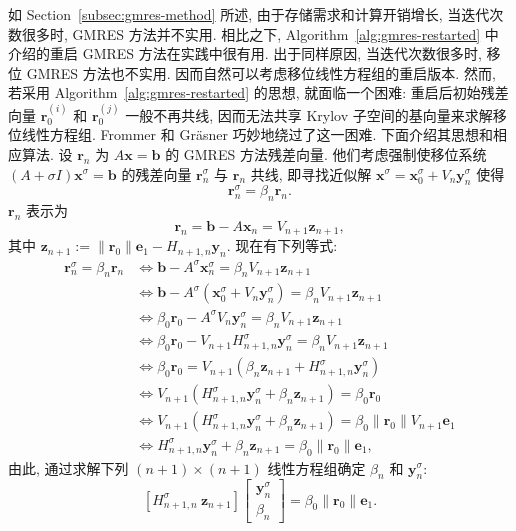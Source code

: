 {如 Section\ \ref{subsec:gmres-method} 所述, 由于存储需求和计算开销增长, 当迭代次数很多时, GMRES 方法并不实用. 相比之下, Algorithm\ \ref{alg:gmres-restarted} 中介绍的重启 GMRES 方法在实践中很有用. 出于同样原因, 当迭代次数很多时, 移位 GMRES 方法也不实用. 因而自然可以考虑移位线性方程组的重启版本. 然而, 若采用 Algorithm\ \ref{alg:gmres-restarted} 的思想, 就面临一个困难: 重启后初始残差向量 $\bm r_0^{(i)}$ 和 $\bm r_0^{(j)}$ 一般不再共线, 因而无法共享 Krylov 子空间的基向量来求解移位线性方程组.}
{Frommer 和 Gräsner  巧妙地绕过了这一困难. 下面介绍其思想和相应算法. 设 $\bm r_n$ 为 $A\bm x=\bm b$ 的 GMRES 方法残差向量. 他们考虑强制使移位系统 $(A+\sigma I)\bm x^{\sigma}=\bm b$ 的残差向量 $\bm r_n^{\sigma}$ 与 $\bm r_n$ 共线, 即寻找近似解 $\bm x^{\sigma}=\bm x_0^{\sigma}+V_n\bm y_n^{\sigma}$ 使得}
\[\bm r_n^{\sigma}=\beta_n\bm r_n.\]
{$\bm r_n$ 表示为}
\[\bm r_n=\bm b-A\bm x_n=V_{n+1}\bm z_{n+1},\]
{其中 $\bm z_{n+1}:=\|\bm r_0\|\bm e_1-H_{n+1,n}\bm y_n$. 现在有下列等式:}
\[\begin{aligned}\bm r_n^{\sigma}=\beta_n\bm r_n&\Leftrightarrow\bm b-A^{\sigma}\bm x_n^{\sigma}=\beta_nV_{n+1}\bm z_{n+1}\\
&\Leftrightarrow\bm b-A^{\sigma}(\bm x_0^{\sigma}+V_n\bm y_n^{\sigma})=\beta_nV_{n+1}\bm z_{n+1}\\
&\Leftrightarrow\beta_0\bm r_0-A^{\sigma}V_n\bm y_n^{\sigma}=\beta_nV_{n+1}\bm z_{n+1}\\
&\Leftrightarrow\beta_0\bm r_0-V_{n+1}H_{n+1,n}^{\sigma}\bm y_n^{\sigma}=\beta_nV_{n+1}\bm z_{n+1}\\
&\Leftrightarrow\beta_0\bm r_0=V_{n+1}(\beta_n\bm z_{n+1}+H_{n+1,n}^{\sigma}\bm y_n^{\sigma})\\
&\Leftrightarrow V_{n+1}(H_{n+1,n}^{\sigma}\bm y_n^{\sigma}+\beta_n\bm z_{n+1})=\beta_0\bm r_0\\
&\Leftrightarrow V_{n+1}(H_{n+1,n}^{\sigma}\bm y_n^{\sigma}+\beta_n\bm z_{n+1})=\beta_0\|\bm r_0\|V_{n+1}\bm e_1\\
&\Leftrightarrow H_{n+1,n}^{\sigma}\bm y_n^{\sigma}+\beta_n\bm z_{n+1}=\beta_0\|\bm r_0\|\bm e_1,\end{aligned}\]
{由此, 通过求解下列 $(n+1)\times(n+1)$ 线性方程组确定 $\beta_n$ 和 $\bm y_n^{\sigma}$:}
\begin{equation}\label{eq:restarted-shifted-gmres-collinearity-system}[H_{n+1,n}^{\sigma}\ \bm z_{n+1}]\begin{bmatrix}\bm y_n^{\sigma}\\\beta_n\end{bmatrix}=\beta_0\|\bm r_0\|\bm e_1.\end{equation}
